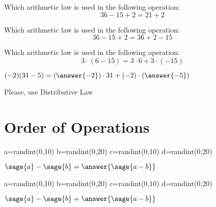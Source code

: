 \documentclass{ximera}
\begin{document}
\begin{problem}
Which arithmetic law is used in the following operation:
$$36-15+2=21+2$$

\begin{multipleChoice}
\end{multipleChoice}
\end{problem}


\begin{problem}
Which arithmetic law is used in the following operation:
$$36-15+2=36+2-15$$

\begin{multipleChoice}
\end{multipleChoice}
\end{problem}

\begin{problem}
Which arithmetic law is used in the following operation:
$$3\cdot (6-15)=3\cdot 6+ 3\cdot (-15)$$

\begin{multipleChoice}
\end{multipleChoice}
\end{problem}


\begin{problem}
    $(-2)(31-5)=(\answer{-2})\cdot 31+(-2)\cdot (\answer{-5})$
\begin{hint}
Please, use Distributive Law
\end{hint}
\end{problem}

\section*{Order of Operations}


\begin{problem}
\begin{sagesilent}
a=randint(0,10)
b=randint(0,20)
c=randint(0,10)
d=randint(0,20)
\end{sagesilent}
$\sage{a}-\sage{b}=\answer{\sage{a-b}} $
\end{problem}

\begin{problem}
\begin{sagesilent}
a=randint(0,10)
b=randint(0,20)
c=randint(0,10)
d=randint(0,20)
\end{sagesilent}
$\sage{a}-\sage{b}=\answer{\sage{a-b}} $
\end{problem}
\end{document}
